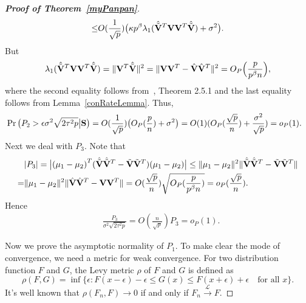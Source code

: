 \documentclass[3p]{elsarticle}
\theoremstyle{plain}
\theoremstyle{definition}
\theoremstyle{remark}
\begin{document}
\begin{appendices}
\begin{proof}[\textbf{Proof of Theorem~\ref{myPanpan}}]
\begin{equation*}
\begin{aligned}
             \leq &
             O(\frac{1}{\sqrt{p}})
             \big(\kappa p^{\beta}\lambda_1(\hat{\tilde{\mathbf{V}}}^T \mathbf{V}\mathbf{V}^T  \hat{\tilde{\mathbf{V}}})+\sigma^2\big).\\
        \end{aligned}
    \end{equation*}
    But
    \begin{equation*}
        \begin{aligned}
\lambda_1(\hat{\tilde{\mathbf{V}}}^T \mathbf{V}\mathbf{V}^T  \hat{\tilde{\mathbf{V}}})
=\|\mathbf{V}^T  \hat{\tilde{\mathbf{V}}}\|^2
            = \|\mathbf{V}\mathbf{V}^T-\hat{\mathbf{V}}\hat{\mathbf{V}}^T\|^2=O_P\Big(\frac{p}{p^{\beta}n}\Big),
        \end{aligned}
    \end{equation*}
    where the second equality follows from~\cite{matrixComputations}, Theorem 2.5.1 and the last equality follows from Lemma~\ref{conRateLemma}. 
    Thus,
    \begin{equation*}
        \begin{aligned}
            &\Pr\big({P_2}>\epsilon{\sigma^2\sqrt{2\tau^2 p}}\big|\mathbf{S}\big)
             =
             O(\frac{1}{\sqrt{p}})
             \big(O_P(\frac{p}{n})+\sigma^2\big)
             =O(1)(O_P(\frac{\sqrt{p}}{n})+\frac{\sigma^2}{\sqrt{p}})
             =o_P(1).
        \end{aligned}
    \end{equation*}
    Next we deal with $P_3$.
    Note that
    \begin{equation*}
        \begin{aligned}
            &|P_3|=
            \big|{(\mu_1-\mu_2)}^T(\hat{\tilde{\mathbf{V}}}\hat{\tilde{\mathbf{V}}}^T-\tilde{\mathbf{V}}\tilde{\mathbf{V}}^T)(\mu_1-\mu_2)\big|
            \leq 
            \|\mu_1-\mu_2\|^2 \|\hat{\tilde{\mathbf{V}}}\hat{\tilde{\mathbf{V}}}^T-\tilde{\mathbf{V}}\tilde{\mathbf{V}}^T\|\\
            =& 
            \|\mu_1-\mu_2\|^2  \|\hat{\mathbf{V}}\hat{\mathbf{V}}^T-\mathbf{V}\mathbf{V}^T\|
        =O(\frac{\sqrt{p}}{n})\sqrt{O_P(\frac{p}{p^{\beta}n})}=o_P(\frac{\sqrt{p}}{n}).
        \end{aligned}
    \end{equation*}
    Hence
    \begin{equation*}
        \begin{aligned}
            &\frac{P_3}{\sigma^2\sqrt{2\tau^2 p}}= O(\frac{n}{\sqrt{p}})P_3=o_P(1).
        \end{aligned}
    \end{equation*}

    Now we prove the asymptotic normality of $P_1$.
    To make clear the mode of convergence, we need a metric for weak convergence. For two distribution function $F$ and $G$, the Levy metric $\rho$ of $F$ and $G$ is defined as
    $$
   \rho(F,G) =\inf\{\epsilon:F(x-\epsilon)-\epsilon\leq G(x)\leq F(x+\epsilon)+\epsilon\quad \textrm{for all $x$}\}.
    $$
    It's well known that $\rho(F_n,F)\to 0$ if and only if $F_n\xrightarrow{\mathcal{L}}F$.


\end{proof}
\end{appendices}
\end{document}
